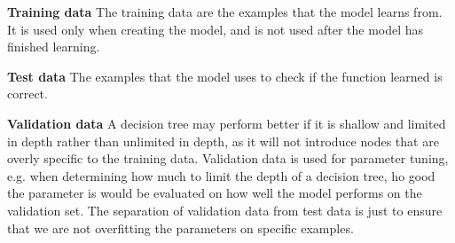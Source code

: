\textbf{Training data} The training data are the examples that the model learns from. It is used only when creating the model, and is not used after the model has finished learning.

\textbf{Test data} The examples that the model uses to check if the function learned is correct.

\textbf{Validation data} A decision tree may perform better if it is shallow and limited in depth rather than unlimited in depth, as it will not introduce nodes that are overly specific to the training data. Validation data is used for parameter tuning, e.g. when determining how much to limit the depth of a decision tree, ho good the parameter is would be evaluated on how well the model performs on the validation set. The separation of validation data from test data is just to ensure that we are not overfitting the parameters on specific examples.
















